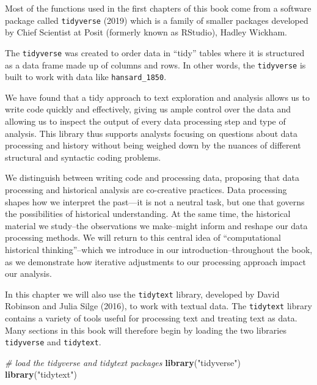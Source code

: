 \documentclass[
]{article}
\newenvironment{Shaded}{\begin{snugshade}}{\end{snugshade}}
\newcommand{\CommentTok}[1]{\textcolor[rgb]{0.56,0.35,0.01}{\textit{#1}}}
\newcommand{\FunctionTok}[1]{\textcolor[rgb]{0.13,0.29,0.53}{\textbf{#1}}}
\newcommand{\NormalTok}[1]{#1}
\newcommand{\StringTok}[1]{\textcolor[rgb]{0.31,0.60,0.02}{#1}}
\begin{document}
Most of the functions used in the first chapters of this book come from
a software package called \texttt{tidyverse} (2019) which is a family of
smaller packages developed by Chief Scientist at Posit (formerly known
as RStudio), Hadley Wickham.

The \texttt{tidyverse} was created to order data in ``tidy'' tables
where it is structured as a data frame made up of columns and rows. In
other words, the \texttt{tidyverse} is built to work with data like
\texttt{hansard\_1850}.

We have found that a tidy approach to text exploration and analysis
allows us to write code quickly and effectively, giving us ample control
over the data and allowing us to inspect the output of every data
processing step and type of analysis. This library thus supports
analysts focusing on questions about data processing and history without
being weighed down by the nuances of different structural and syntactic
coding problems.

We distinguish between writing code and processing data, proposing that
data processing and historical analysis are co-creative practices. Data
processing shapes how we interpret the past---it is not a neutral task,
but one that governs the possibilities of historical understanding. At
the same time, the historical material we study--the observations we
make--might inform and reshape our data processing methods. We will
return to this central idea of ``computational historical
thinking''--which we introduce in our introduction--throughout the book,
as we demonstrate how iterative adjustments to our processing approach
impact our analysis.

In this chapter we will also use the \texttt{tidytext} library,
developed by David Robinson and Julia Silge (2016), to work with textual
data. The \texttt{tidytext} library contains a variety of tools useful
for processing text and treating text as data. Many sections in this
book will therefore begin by loading the two libraries
\texttt{tidyverse} and \texttt{tidytext}.

\begin{Shaded}
\begin{Highlighting}[]
\CommentTok{\# load the tidyverse and tidytext packages}
\FunctionTok{library}\NormalTok{(}\StringTok{"tidyverse"}\NormalTok{)}
\FunctionTok{library}\NormalTok{(}\StringTok{"tidytext"}\NormalTok{)}
\end{Highlighting}
\end{Shaded}
\end{document}
